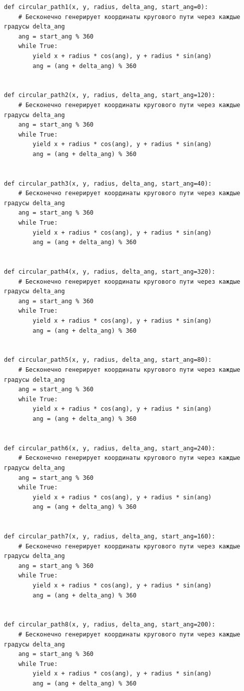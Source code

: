 \documentclass[11pt,a4paper]{report}
\begin{document}
\begin{verbatim}
def circular_path1(x, y, radius, delta_ang, start_ang=0):
    # Бесконечно генерирует координаты кругового пути через каждые градусы delta_ang
    ang = start_ang % 360
    while True:
        yield x + radius * cos(ang), y + radius * sin(ang)
        ang = (ang + delta_ang) % 360


def circular_path2(x, y, radius, delta_ang, start_ang=120):
    # Бесконечно генерирует координаты кругового пути через каждые градусы delta_ang
    ang = start_ang % 360
    while True:
        yield x + radius * cos(ang), y + radius * sin(ang)
        ang = (ang + delta_ang) % 360


def circular_path3(x, y, radius, delta_ang, start_ang=40):
    # Бесконечно генерирует координаты кругового пути через каждые градусы delta_ang
    ang = start_ang % 360
    while True:
        yield x + radius * cos(ang), y + radius * sin(ang)
        ang = (ang + delta_ang) % 360


def circular_path4(x, y, radius, delta_ang, start_ang=320):
    # Бесконечно генерирует координаты кругового пути через каждые градусы delta_ang
    ang = start_ang % 360
    while True:
        yield x + radius * cos(ang), y + radius * sin(ang)
        ang = (ang + delta_ang) % 360


def circular_path5(x, y, radius, delta_ang, start_ang=80):
    # Бесконечно генерирует координаты кругового пути через каждые градусы delta_ang
    ang = start_ang % 360
    while True:
        yield x + radius * cos(ang), y + radius * sin(ang)
        ang = (ang + delta_ang) % 360


def circular_path6(x, y, radius, delta_ang, start_ang=240):
    # Бесконечно генерирует координаты кругового пути через каждые градусы delta_ang
    ang = start_ang % 360
    while True:
        yield x + radius * cos(ang), y + radius * sin(ang)
        ang = (ang + delta_ang) % 360


def circular_path7(x, y, radius, delta_ang, start_ang=160):
    # Бесконечно генерирует координаты кругового пути через каждые градусы delta_ang
    ang = start_ang % 360
    while True:
        yield x + radius * cos(ang), y + radius * sin(ang)
        ang = (ang + delta_ang) % 360


def circular_path8(x, y, radius, delta_ang, start_ang=200):
    # Бесконечно генерирует координаты кругового пути через каждые градусы delta_ang
    ang = start_ang % 360
    while True:
        yield x + radius * cos(ang), y + radius * sin(ang)
        ang = (ang + delta_ang) % 360



\end{verbatim}
\end{document}
